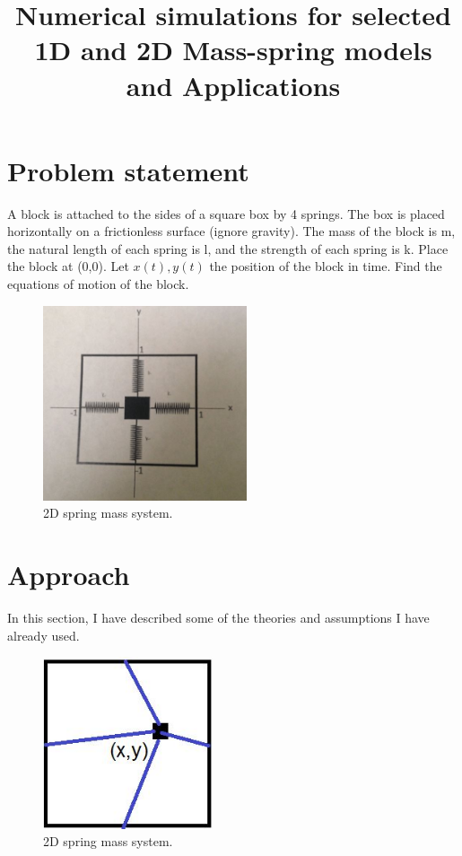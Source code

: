 \documentclass[extendedabs]{AAVL}
\begin{document}
\title{Numerical simulations for selected 1D and 2D Mass-spring
models and Applications}




\maketitle
\section{Problem statement}
\label{aa}

\noindent
A block is attached to the sides of a square box by 4 springs. The box is placed horizontally on a frictionless surface (ignore gravity). The mass of the block is m, the natural length of each spring is l, and the strength of each spring is k. Place the block at (0,0). Let $x(t),y(t)$ the position of the block in time. Find the equations of motion of the block.


\begin{figure}[hbt!]
\centering
\includegraphics[width=6cm]{images/a.JPG}
\caption{2D spring mass system. }
\vspace{-2mm}
\label{fig:b}
\end{figure}

\section{Approach}
In this section, I have described some of the theories and assumptions I have already used. 


\begin{figure}[hbt!]
\centering
\includegraphics[width= 5cm]{images/b.JPG}
\caption{2D spring mass system. }
\vspace{-2mm}
\label{fig:b}
\end{figure}
\end{document}
